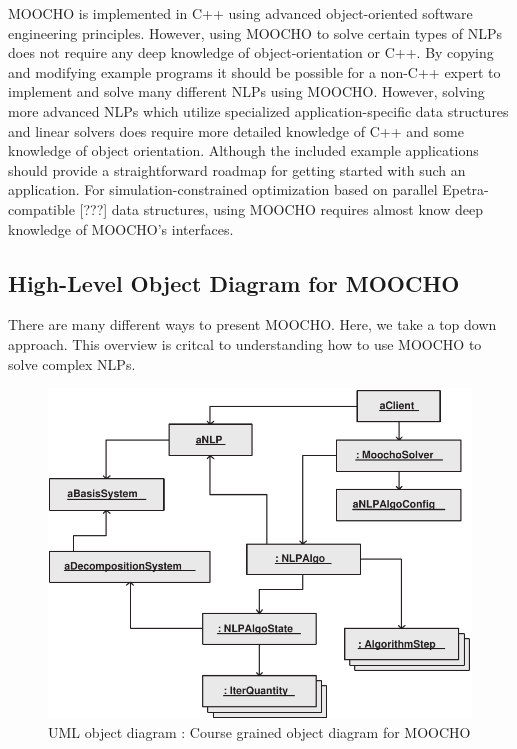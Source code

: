 \documentclass[pdf,ps2pdf,11pt]{SANDreport}
\begin{document}
MOOCHO is implemented in C++ using advanced object-oriented software
engineering principles.  However, using MOOCHO to solve certain types of NLPs
does not require any deep knowledge of object-orientation or C++.  By copying
and modifying example programs it should be possible for a non-C++ expert to
implement and solve many different NLPs using MOOCHO.  However, solving more
advanced NLPs which utilize specialized application-specific data structures
and linear solvers does require more detailed knowledge of C++ and some
knowledge of object orientation.  Although the included example applications
should provide a straightforward roadmap for getting started with such an
application.  For simulation-constrained optimization based on parallel
Epetra-compatible [???] data structures, using MOOCHO requires almost know
deep knowledge of MOOCHO's interfaces.

%
\subsection{High-Level Object Diagram for MOOCHO}
%

There are many different ways to present MOOCHO.  Here, we take a top down
approach.  This overview is critcal to understanding how to use MOOCHO to
solve complex NLPs.

{\bsinglespace
\begin{figure}[t]
\begin{center}
\includegraphics*[bb= 0.0in 0.0in 5.2in 4.4in,scale=0.70
]{MoochoObjDiagram}
\end{center}
\caption{
\label{moocho:fig:moocho_obj_diag}
UML object diagram : Course grained object diagram for MOOCHO
}
\end{figure}
\esinglespace}
\end{document}

